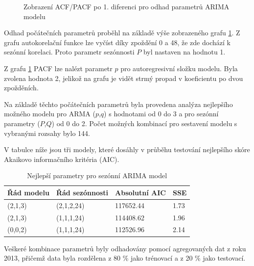 \documentclass[FM,BP,fonts]{tulthesis}
\begin{document}
\begin{figure}[htbp]
 	\centering
 	\caption{Zobrazení ACF/PACF po 1. diferenci pro odhad parametrů ARIMA modelu}
 	\label{fig:arima_acf_pacf}
 \end{figure}
Odhad počátečních parametrů proběhl na základě výše zobrazeného grafu \ref{fig:arima_acf_pacf}. Z grafu autokorelační funkce lze vyčíst díky zpoždění 0 a 48, že zde dochází k sezónní korelaci. Proto parametr sezónnosti $P$ byl nastaven na hodnotu 1.

Z grafu \ref{fig:arima_acf_pacf} PACF lze nalézt parametr $p$ pro autoregresivní složku modelu. Byla zvolena hodnota 2, jelikož na grafu je vidět strmý propad v koeficientu po dvou zpožděních. 

Na základě těchto počátečních parametrů byla provedena analýza nejlepšího možného modelu pro ARMA ($p$,$q$) s hodnotami od 0 do 3 a pro sezónní parametry ($P$,$Q$) od 0 do 2. Počet možných kombinací pro sestavení modelu s vybranými rozsahy bylo 144.

V tabulce níže jsou tři modely, které dosáhly v průběhu testování nejlepšího skóre Akaikovo informačního kritéria (AIC).

\begin{table}[!ht]
	\centering
	\caption{Nejlepší parametry pro sezónní ARIMA model}
	\label{Tab:arimamodels}
	\begin{tabularx}{\linewidth}{lXXX}
		\hline
		\textbf{Řád modelu} & \textbf{Řád sezónnosti} & \textbf{Absolutní AIC} & \textbf{SSE} \\ \hline
		(2,1,3) & (2,1,2,24) & 117652.44 & 1.73 \\
		(2,1,3) & (1,1,1,24) & 114408.62 & 1.96 \\
		(0,0,2) & (1,1,1,24) & 112526.96 & 2.14 \\
	\end{tabularx}
\end{table}
Veškeré kombinace parametrů byly odhadovány pomocí agregovaných dat z roku 2013, přičemž data byla rozdělena z 80 \% jako trénovací a z 20 \% jako testovací. 
\end{document}

